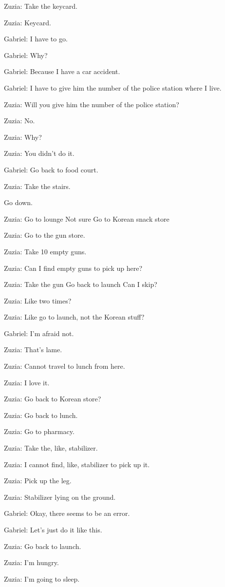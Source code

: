 Zuzia: Take the keycard.

Zuzia: Keycard.

Gabriel: I have to go.

Gabriel: Why?

Gabriel: Because I have a car accident.

Gabriel: I have to give him the number of the police station where I live.

Zuzia: Will you give him the number of the police station?

Zuzia: No.

Zuzia: Why?

Zuzia: You didn't do it.

Gabriel: Go back to food court.

Zuzia: Take the stairs.

Go down.

Zuzia: Go to lounge Not sure Go to Korean snack store

Zuzia: Go to the gun store.

Zuzia: Take 10 empty guns.

Zuzia: Can I find empty guns to pick up here?

Zuzia: Take the gun Go back to launch Can I skip?

Zuzia: Like two times?

Zuzia: Like go to launch, not the Korean stuff?

Gabriel: I'm afraid not.

Zuzia: That's lame.

Zuzia: Cannot travel to lunch from here.

Zuzia: I love it.

Zuzia: Go back to Korean store?

Zuzia: Go back to lunch.

Zuzia: Go to pharmacy.

Zuzia: Take the, like, stabilizer.

Zuzia: I cannot find, like, stabilizer to pick up it.

Zuzia: Pick up the leg.

Zuzia: Stabilizer lying on the ground.

Gabriel: Okay, there seems to be an error.

Gabriel: Let's just do it like this.

Zuzia: Go back to launch.

Zuzia: I'm hungry.

Zuzia: I'm going to sleep.

